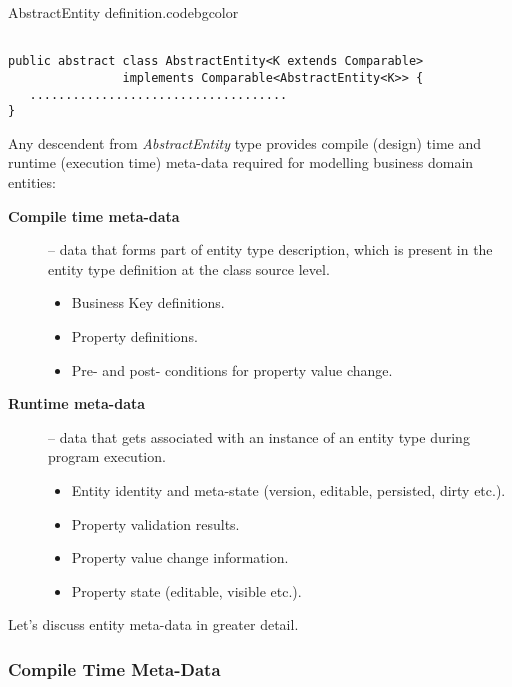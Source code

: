   \begin{code}{AbstractEntity definition.}{\label{lst:AbstractEntity}}{codebgcolor}
    \begin{lstlisting}

public abstract class AbstractEntity<K extends Comparable> 
                implements Comparable<AbstractEntity<K>> {
   ....................................
}
    \end{lstlisting}
  \end{code}


  Any descendent from \emph{AbstractEntity} type provides compile (design) time and runtime (execution time) meta-data required for modelling business domain entities:
  \begin{description}
   \item[\textbf{Compile time meta-data}] -- data that forms part of entity type description, which is present in the entity type definition at the class source level.
      \begin{itemize}
	\item Business Key definitions.
	\item Property definitions.
	\item Pre- and post- conditions for property value change.
      \end{itemize}

   \item[\textbf{Runtime meta-data}] -- data that gets associated with an instance of an entity type during program execution.
      \begin{itemize}
	\item Entity identity and meta-state (version, editable, persisted, dirty etc.).
	\item Property validation results.
	\item Property value change information.
	\item Property state (editable, visible etc.).	
      \end{itemize}
   \end{description}

  Let's discuss entity meta-data in greater detail.

\subsubsection{Compile Time Meta-Data}
  

